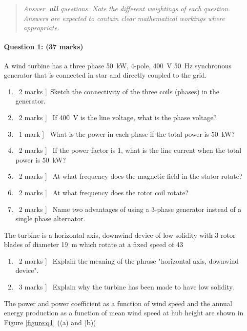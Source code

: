 \documentclass[a4paper,12pt,fleqn]{article}
\begin{document}
\newpage
\begin{quote}
\textit{Answer\textbf{\ all} questions.  Note the different weightings of each question.
Answers are expected to contain clear mathematical workings where appropriate.}
\end{quote}
\newpage


\paragraph{\textbf{Question 1: (37 marks)}}
A wind turbine has a three phase \SI{50}{\kilo\watt}, 4-pole, \SI{400}{\volt} \SI{50}{\hertz} synchronous generator that is connected in star
 and directly coupled to the grid.
\begin{enumerate} [label=\alph*)]
\item \lbrack\ 2 marks ]\ Sketch the connectivity of the three coils (phases) in the generator.
\item \lbrack\ 2 marks ] \ If \SI{400}{\volt} is the line voltage, what is the phase voltage?
\item \lbrack\ 1 mark ] \ What is the power in each phase if the total power is \SI{50}{\kilo\watt}?
\item \lbrack\ 2 marks ] \ If the power factor is 1, what is the line current when the total power is \SI{50}{\kilo\watt}?
\item \lbrack\ 2 marks ] \ At what frequency does the magnetic field in the stator rotate?
\item \lbrack\ 2 marks ] \ At what frequency does the rotor coil rotate?
\item \lbrack\ 2 marks ] \ Name two advantages of using a 3-phase generator instead of a single phase alternator.
\end{enumerate}
The turbine is a horizontal axis, downwind device of low solidity with 3 rotor blades of diameter \SI{19}{\metre} which rotate at a fixed speed
 of \SI{43}{\rpm}
\begin{enumerate} [resume,label=\alph*)]
\item \lbrack\ 2 marks ] \ Explain the meaning of the phrase "horizontal axis, downwind device".
\item \lbrack\ 3 marks ] \ Explain why the turbine has been made to have low solidity.  
\end{enumerate}

The power and power coefficient as a function of wind speed and the annual energy production as a function of mean wind
speed at hub height are shown in Figure \ref{figure:q1} ((a) and (b))
\end{document}
